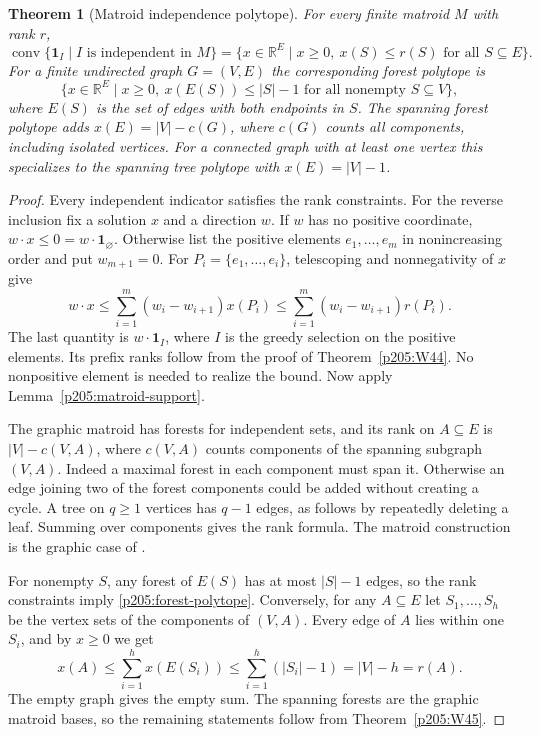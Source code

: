 \documentclass[11pt,oneside,openany]{book}
\theoremstyle{plain}
\newtheorem{theorem}{Theorem}[chapter]
\theoremstyle{definition}
\theoremstyle{remark}
\begin{document}
\begin{theorem}[Matroid independence polytope]
\label{p205:W46}
For every finite matroid \(M\) with rank \(r\),
\[
 \operatorname{conv}\{\mathbf 1_I\mid I\text{ is independent in }M\}
 =
 \{x\in\mathbb R^E\mid x\ge 0,\ x(S)\le r(S)\text{ for all }S\subseteq E\}.
\]
For a finite undirected graph \(G=(V,E)\) the corresponding forest
polytope is
\begin{equation}
\label{p205:forest-polytope}
 \{x\in\mathbb R^E\mid
      x\ge0,\ x(E(S))\le |S|-1
      \text{ for all nonempty }S\subseteq V\},
\end{equation}
where \(E(S)\) is the set of edges with both endpoints in \(S\).
The spanning forest polytope adds \(x(E)=|V|-c(G)\), where
\(c(G)\) counts all components, including isolated vertices.
For a connected graph with at least one vertex this specializes
to the spanning tree polytope with \(x(E)=|V|-1\).
\end{theorem}

\begin{proof}
Every independent indicator satisfies the rank constraints.
For the reverse inclusion fix a solution \(x\) and a direction \(w\).
If \(w\) has no positive coordinate, \(w\cdot x\le0=w\cdot
\mathbf 1_\varnothing\). Otherwise list the positive elements
\(e_1,\ldots,e_m\) in nonincreasing order and put \(w_{m+1}=0\).
For \(P_i=\{e_1,\ldots,e_i\}\), telescoping and nonnegativity of \(x\)
give
\[
 w\cdot x\le \sum_{i=1}^m (w_i-w_{i+1})x(P_i)
 \le \sum_{i=1}^m (w_i-w_{i+1})r(P_i).
\]
The last quantity is \(w\cdot\mathbf 1_I\), where \(I\) is the
greedy selection on the positive elements. Its prefix ranks follow
from the proof of Theorem~\ref{p205:W44}. No nonpositive element is
needed to realize the bound. Now apply Lemma~\ref{p205:matroid-support}.

The graphic matroid has forests for independent sets, and its rank
on \(A\subseteq E\) is \(|V|-c(V,A)\), where \(c(V,A)\) counts
components of the spanning subgraph \((V,A)\).
Indeed a maximal forest in each component must span it. Otherwise
an edge joining two of the forest components could be added without
creating a cycle. A tree on \(q\ge1\) vertices has \(q-1\) edges,
as follows by repeatedly deleting a leaf. Summing over components
gives the rank formula. The matroid construction is the graphic
case of \cite[Chapter~11, W72]{p204}.

For nonempty \(S\), any forest of \(E(S)\) has at most \(|S|-1\)
edges, so the rank constraints imply \eqref{p205:forest-polytope}.
Conversely, for any \(A\subseteq E\) let \(S_1,\ldots,S_h\) be
the vertex sets of the components of \((V,A)\). Every edge of
\(A\) lies within one \(S_i\), and by \(x\ge0\) we get
\[
 x(A)\le\sum_{i=1}^h x(E(S_i))
      \le\sum_{i=1}^h(|S_i|-1)
      =|V|-h=r(A).
\]
The empty graph gives the empty sum. The spanning forests are
the graphic matroid bases, so the remaining statements follow
from Theorem~\ref{p205:W45}.
\end{proof}
\end{document}
